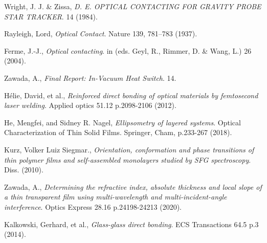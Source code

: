 \documentclass[colorlinks=true,pdfstartview=FitV,linkcolor=blue,
            citecolor=red,urlcolor=magenta]{ligodoc}
\begin{document}
\begin{thebibliography}{9}
	  Wright, J. J. & Zissa,
	  \emph{D. E. OPTICAL CONTACTING FOR GRAVITY PROBE STAR TRACKER}.
	  14 (1984).    
      
	  Rayleigh, Lord,
	  \emph{Optical Contact}.
	  Nature 139, 781–783 (1937).
	  
	  Ferme, J.-J.,
	  \emph{Optical contacting}.
	  in (eds. Geyl, R., Rimmer, D. & Wang, L.) 26 (2004).
	 
	  Zawada, A.,
	  \emph{Final Report: In-Vacuum Heat Switch}.
	  14.
    
	  Hélie, David, et al.,
	  \emph{Reinforced direct bonding of optical materials by femtosecond laser welding}.
	  Applied optics 51.12 p.2098-2106 (2012).    

	  He, Mengfei, and Sidney R. Nagel,
	  \emph{Ellipsometry of layered systems}.
	  Optical Characterization of Thin Solid Films. Springer, Cham, p.233-267 (2018).

	  Kurz, Volker Luiz Siegmar.,
	  \emph{Orientation, conformation and phase transitions of thin polymer films and self-assembled monolayers studied by SFG spectroscopy}.
	  Diss. (2010).

	  Zawada, A.,
	  \emph{Determining the refractive index, absolute thickness and local slope of a thin transparent film using multi-wavelength and multi-incident-angle interference}.
	  Optics Express 28.16 p.24198-24213 (2020).
  
	  Kalkowski, Gerhard, et al.,
	  \emph{Glass-glass direct bonding}.
	  ECS Transactions 64.5 p.3 (2014).
 
\end{thebibliography} %
\end{document}
